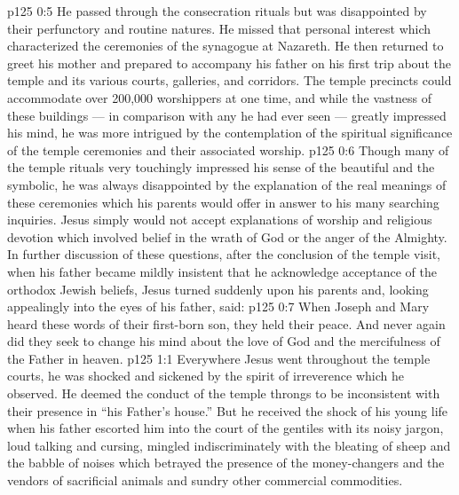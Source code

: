 \vs p125 0:5 He passed through the consecration rituals but was disappointed by their perfunctory and routine natures. He missed that personal interest which characterized the ceremonies of the synagogue at Nazareth. He then returned to greet his mother and prepared to accompany his father on his first trip about the temple and its various courts, galleries, and corridors. The temple precincts could accommodate over 200,000 worshippers at one time, and while the vastness of these buildings --- in comparison with any he had ever seen --- greatly impressed his mind, he was more intrigued by the contemplation of the spiritual significance of the temple ceremonies and their associated worship.
\vs p125 0:6 Though many of the temple rituals very touchingly impressed his sense of the beautiful and the symbolic, he was always disappointed by the explanation of the real meanings of these ceremonies which his parents would offer in answer to his many searching inquiries. Jesus simply would not accept explanations of worship and religious devotion which involved belief in the wrath of God or the anger of the Almighty. In further discussion of these questions, after the conclusion of the temple visit, when his father became mildly insistent that he acknowledge acceptance of the orthodox Jewish beliefs, Jesus turned suddenly upon his parents and, looking appealingly into the eyes of his father, said: 
\vs p125 0:7 When Joseph and Mary heard these words of their first\hyp{}born son, they held their peace. And never again did they seek to change his mind about the love of God and the mercifulness of the Father in heaven.
\vs p125 1:1 Everywhere Jesus went throughout the temple courts, he was shocked and sickened by the spirit of irreverence which he observed. He deemed the conduct of the temple throngs to be inconsistent with their presence in “his Father’s house.” But he received the shock of his young life when his father escorted him into the court of the gentiles with its noisy jargon, loud talking and cursing, mingled indiscriminately with the bleating of sheep and the babble of noises which betrayed the presence of the money\hyp{}changers and the vendors of sacrificial animals and sundry other commercial commodities.
